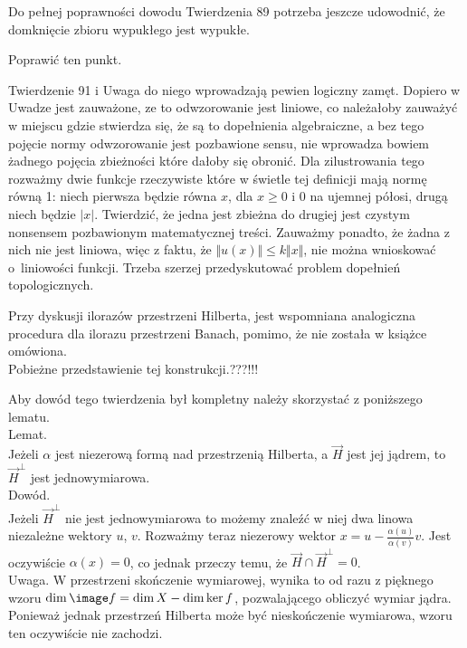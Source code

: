 \documentclass[a4paper,11pt]{article}
\numberwithin{equation}{section}
\begin{document}
\VerSpaceFour





\noindent
{} Do pełnej poprawności dowodu Twierdzenia 89 potrzeba
jeszcze udowodnić, że domknięcie zbioru wypukłego jest wypukłe.

\VerSpaceFour





\noindent
{} Poprawić ten punkt.

\VerSpaceFour





\noindent
  Twierdzenie 91 i Uwaga do niego wprowadzają pewien
logiczny zamęt. Dopiero w Uwadze jest zauważone, ze to odwzorowanie
jest liniowe, co należałoby zauważyć w miejscu gdzie stwierdza się, że
są to dopełnienia algebraiczne, a bez tego pojęcie normy odwzorowanie
jest pozbawione sensu, nie wprowadza bowiem żadnego pojęcia zbieżności
które dałoby się obronić. Dla zilustrowania tego rozważmy dwie funkcje
rzeczywiste które w świetle tej definicji mają normę równą 1: niech
pierwsza będzie równa $x$, dla $x \geq 0$ i 0 na ujemnej półosi, drugą
niech będzie $| x |$. Twierdzić, że jedna jest zbieżna do drugiej jest
czystym nonsensem pozbawionym matematycznej treści. Zauważmy ponadto,
że żadna z nich nie jest liniowa, więc z faktu, że
$\Vert u( x ) \Vert \leq k \Vert x \Vert$, nie można wnioskować o~liniowości funkcji.
Trzeba szerzej przedyskutować problem dopełnień topologicznych.

\VerSpaceFour





\noindent
{} Przy dyskusji ilorazów przestrzeni Hilberta, jest
wspomniana analogiczna procedura dla ilorazu przestrzeni Banach,
pomimo, że nie została w książce omówiona. \\
Pobieżne przedstawienie tej konstrukcji.???!!!

\VerSpaceFour





\noindent
{} Aby dowód tego twierdzenia był kompletny należy
skorzystać z poniższego lematu. \\
Lemat. \\
Jeżeli $\alpha$ jest niezerową formą nad przestrzenią Hilberta, a
$\vec{ H }$
jest jej jądrem, to $\vec{ H }^{ \bot }$ jest jednowymiarowa. \\
Dowód. \\
Jeżeli $\vec{ H }^{ \bot }$ nie jest jednowymiarowa to możemy znaleźć
w niej dwa linowa niezależne wektory $u$, $v$. Rozważmy teraz
niezerowy wektor $x = u -\frac{ \alpha( u ) }{ \alpha( v ) }v$. Jest
oczywiście $\alpha( x ) = 0$,
co jednak przeczy temu, że $\vec{ H } \cap \vec{ H }^{ \bot } =  0$. \\
Uwaga. W przestrzeni skończenie wymiarowej, wynika to od razu z
pięknego wzoru $\dim\image f = \dim X - \dim\ker f$, pozwalającego
obliczyć wymiar jądra. Ponieważ jednak przestrzeń Hilberta może być
nieskończenie wymiarowa, wzoru ten oczywiście nie zachodzi.
\end{document}
